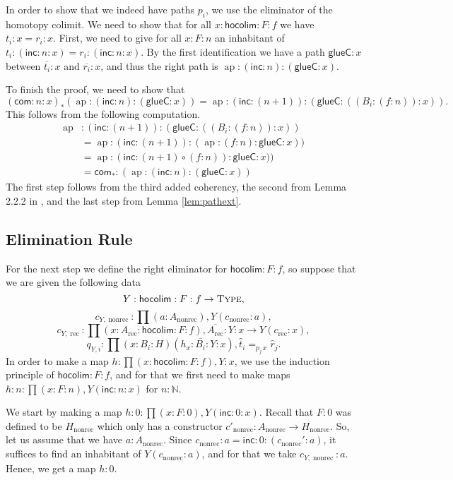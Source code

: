 \documentclass[a4paper,UKenglish]{lipics-v2016}
\newcommand{\Boperator}[1]{\mathsf{#1}}
\newcommand{\rec}[0]{\operatorname{rec}}
\newcommand{\nonrec}[0]{\operatorname{nonrec}}
\newcommand{\ap}[0]{\operatorname{ap}}
\newcommand{\glueC}[0]{\Boperator{glueC}}
\newcommand{\hocolim}[0]{\Boperator{hocolim}}
\newcommand{\inc}[0]{\Boperator{inc}}
\newcommand{\com}[0]{\Boperator{com}}
\newcommand{\Type}[0]{\operatorname{\textsc{Type}}}
\newcommand{\dak}[1]{\widehat{#1}}
\newcommand{\hatt}{\dak{t}}
\newcommand{\hatr}{\dak{r}}
\begin{document}
In order to show that we indeed have paths $p_i$, we use the eliminator of the homotopy colimit.
We need to show that for all $x : \hocolim : F : f$ we have $t_i : x = r_i : x$. 
First, we need to give for all $x : F : n$ an inhabitant of $t_i : (\inc : n : x) = r_i : (\inc : n : x)$.
By the first identification we have a path $\glueC : x$ between $\overline{t_i} : x$ and $\overline{r_i} : x$, and thus the right path is $\ap : (\inc : n) : (\glueC : x)$. 

To finish the proof, we need to show that 
\[
(\com : n : x)_*(\ap : (\inc : n) : (\glueC : x)) = \ap : (\inc : (n+1)) : (\glueC : ((B_i :(f :n)) : x)).
\]
This follows from the following computation.
\begin{equation*}
\begin{split}
\ap &: (\inc : (n+1)) : (\glueC : ((B_i :(f : n)) : x))\\
&= \ap : (\inc : (n+1)) : (\ap : (f : n) :\glueC : x))\\
&= \ap : (\inc : (n+1) \circ (f : n)) :\glueC : x))\\
&=\com_* : (\ap : (\inc : n) : (\glueC : x))
\end{split}
\end{equation*}
The first step follows from the third added coherency, the second from Lemma 2.2.2 in \cite{hottbook}, and the last step from Lemma \ref{lem:pathext}.


\subsection{Elimination Rule}
For the next step we define the right eliminator for $\hocolim : F : f$, so suppose that we are given the following data
\[
Y : \hocolim : F : f \rightarrow \Type,
\]
\[
c_{Y, \nonrec} : \prod (a : A_{\nonrec}), Y(c_{\nonrec} : a),
\]
\[
c_{Y, \rec} : \prod (x : A_{\rec} : \hocolim : F : f), \overline{A_{\rec}} : Y : x \rightarrow Y(c_{\rec} : x),
\]
\[
q_{Y, i} : \prod (x : B_i : H)(h_x : \overline{B_i} : Y : x), \hatt_i =_{p_j \, x} \hatr_j.
\]
In order to make a map $h : \prod (x : \hocolim : F : f), Y : x$, we use the induction principle of $\hocolim : F : f$, and for that we first need to make maps $h : n : \prod (x : F : n), Y(\inc : n : x)$ for $n : \mathbb{N}$.

We start by making a map $h : 0 : \prod (x : F : 0), Y(\inc : 0 : x)$.
Recall that $F : 0$ was defined to be $H_{\nonrec}$ which only has a constructor $c'_{\nonrec} : A_{\nonrec} \rightarrow H_{\nonrec}$.
So, let us assume that we have $a : A_{\nonrec}$.
Since $c_{\nonrec} : a = \inc : 0 : (c_{\nonrec}' : a)$, it suffices to find an inhabitant of $Y(c_{\nonrec} : a)$, and for that we take $c_{Y, \nonrec} : a$.
Hence, we get a map $h : 0$.
\end{document}
